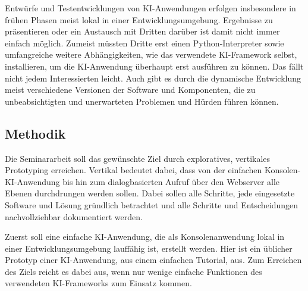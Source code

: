 \documentclass[12pt,oneside,titlepage,listof=totoc,bibliography=totoc]{scrartcl}
\begin{document}
Entwürfe und Testentwicklungen von \ac{KI}-Anwendungen erfolgen insbesondere in frühen Phasen meist lokal in einer Entwicklungsumgebung. Ergebnisse zu präsentieren oder ein Austausch mit Dritten darüber ist damit nicht immer einfach möglich. Zumeist müssten Dritte erst einen Python-Interpreter sowie umfangreiche weitere Abhängigkeiten, wie das verwendete \ac{KI}-Framework selbst, installieren, um die \ac{KI}-Anwendung überhaupt erst ausführen zu können. Das fällt nicht jedem Interessierten leicht. Auch gibt es durch die dynamische Entwicklung meist verschiedene Versionen der Software und Komponenten, die zu unbeabsichtigten und unerwarteten Problemen und Hürden führen können.






\subsection{Methodik}

Die Seminararbeit soll das gewünschte Ziel durch exploratives, vertikales Prototyping erreichen. Vertikal bedeutet dabei, dass von der einfachen Konsolen-KI-Anwendung bis hin zum dialogbasierten Aufruf über den Webserver alle Ebenen durchdrungen werden sollen. Dabei sollen alle Schritte, jede eingesetzte Software und Lösung gründlich betrachtet und alle Schritte und Entscheidungen nachvollziehbar dokumentiert werden.

Zuerst soll eine einfache KI-Anwendung, die als Konsolenanwendung lokal in einer Entwicklungsumgebung lauffähig ist, erstellt werden. Hier ist ein üblicher Prototyp einer KI-Anwendung, \zb aus einem einfachen Tutorial, aus. Zum Erreichen des Ziels reicht es dabei aus, wenn nur wenige einfache Funktionen des verwendeten KI-Frameworks zum Einsatz kommen.
\end{document}
